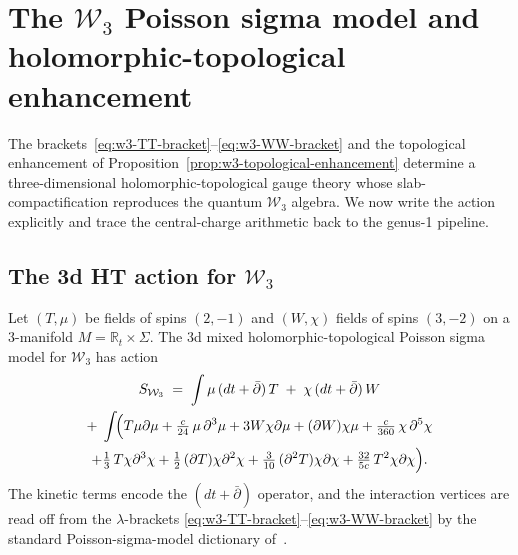 \section{The \texorpdfstring{$\mathcal{W}_3$}{W3} Poisson sigma model and holomorphic-topological enhancement}
\label{sec:w3-poisson-sigma-model}

The brackets~\eqref{eq:w3-TT-bracket}--\eqref{eq:w3-WW-bracket} and
the topological enhancement of
Proposition~\ref{prop:w3-topological-enhancement} determine a
three-dimensional holomorphic-topological gauge theory whose
slab-compactification reproduces the quantum $\mathcal{W}_3$ algebra.
We now write the action explicitly and trace the central-charge
arithmetic back to the genus-1 pipeline.

\subsection{The 3d HT action for \texorpdfstring{$\mathcal{W}_3$}{W3}}

\begin{proposition}
\label{prop:w3-3d-action}
Let $(T,\mu)$ be fields of spins $(2,-1)$ and $(W,\chi)$ fields of
spins $(3,-2)$ on a $3$-manifold $M = \mathbb{R}_t \times \Sigma$.
The 3d mixed holomorphic-topological Poisson sigma model for
$\mathcal{W}_3$ has action
\begin{multline}\label{eq:w3-3d-action}
  S_{\mathcal{W}_3}
  \;=\;
  \int \mu\,(dt + \bar\partial)\,T
  \;+\;
  \chi\,(dt + \bar\partial)\,W \\
  +\;\int\!\Bigl(
    T\mu\partial\mu
    + \tfrac{c}{24}\,\mu\,\partial^3\mu
    + 3W\chi\partial\mu
    + (\partial W)\chi\mu
    + \tfrac{c}{360}\,\chi\,\partial^5\chi \\
    + \tfrac{1}{3}\,T\chi\partial^3\chi
    + \tfrac{1}{2}\,(\partial T)\chi\partial^2\chi
    + \tfrac{3}{10}\,(\partial^2 T)\chi\partial\chi
    + \tfrac{32}{5c}\,T^2\chi\partial\chi
  \Bigr).
\end{multline}
The kinetic terms encode the $(dt + \bar\partial)$ operator, and the
interaction vertices are read off from the $\lambda$-brackets
\eqref{eq:w3-TT-bracket}--\eqref{eq:w3-WW-bracket} by the standard
Poisson-sigma-model dictionary of~\cite[\S3.4]{KhanZeng25}.
\end{proposition}

